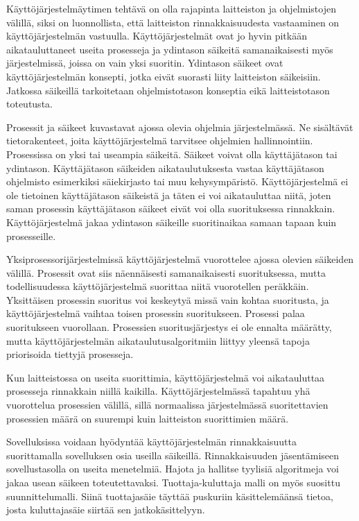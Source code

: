 \documentclass[a4paper, 12pt]{article}
\begin{document}
Käyttöjärjestelmäytimen tehtävä on olla rajapinta laitteiston ja ohjelmistojen 
välillä, siksi on luonnollista, että laitteiston rinnakkaisuudesta vastaaminen
on käyttöjärjestelmän vastuulla. Käyttöjärjestelmät ovat jo hyvin pitkään
aikatauluttaneet useita prosesseja ja ydintason säikeitä samanaikaisesti myös 
järjestelmissä, joissa on 
vain yksi suoritin.
Ydintason säikeet ovat käyttöjärjestelmän konsepti, jotka
eivät suorasti liity laitteiston säikeisiin. 
Jatkossa
säikeillä tarkoitetaan ohjelmistotason konseptia 
eikä laitteistotason toteutusta.


Prosessit ja säikeet kuvastavat ajossa olevia
ohjelmia järjestelmässä. Ne sisältävät tietorakenteet,
joita käyttöjärjestelmä tarvitsee ohjelmien hallinnointiin.
Prosessissa on yksi tai useampia säikeitä.
Säikeet voivat olla käyttäjätason tai ydintason. Käyttäjätason 
säikeiden aikataulutuksesta vastaa käyttäjätason ohjelmisto
esimerkiksi säiekirjasto tai muu kehysympäristö.
Käyttöjärjestelmä ei ole tietoinen käyttäjätason säikeistä
ja täten ei voi aikatauluttaa niitä, joten saman
prosessin käyttäjätason säikeet eivät voi olla
suorituksessa rinnakkain. 
Käyttöjärjestelmä jakaa ydintason säikeille suoritinaikaa samaan
tapaan kuin prosesseille.


Yksiprosessorijärjestelmissä käyttöjärjestelmä vuorottelee
ajossa olevien säikeiden välillä. Prosessit
ovat siis näennäisesti samanaikaisesti suorituksessa,
mutta todellisuudessa käyttöjärjestelmä suorittaa
niitä vuorotellen peräkkäin. Yksittäisen prosessin
suoritus voi keskeytyä missä vain kohtaa suoritusta, 
ja käyttöjärjestelmä vaihtaa toisen prosessin suoritukseen.
Prosessi palaa suoritukseen vuorollaan.
Prosessien suoritusjärjestys ei ole ennalta määrätty, mutta
käyttöjärjestelmän aikataulutusalgoritmiin liittyy yleensä
tapoja priorisoida tiettyjä prosesseja.


Kun laitteistossa on useita suorittimia, käyttöjärjestelmä
voi aikatauluttaa prosesseja rinnakkain niillä kaikilla.
Käyttöjärjestelmässä tapahtuu yhä
vuorottelua prosessien välillä, sillä normaalissa
järjestelmässä suoritettavien prosessien määrä on suurempi
kuin laitteiston suorittimien määrä.

Sovelluksissa voidaan hyödyntää käyttöjärjestelmän
rinnakkaisuutta suorittamalla sovelluksen osia useilla säikeillä.
Rinnakkaisuuden jäsentämiseen sovellustasolla on useita
menetelmiä. 
Hajota ja hallitse tyylisiä 
algoritmeja voi jakaa usean säikeen
toteutettavaksi.
Tuottaja-kuluttaja malli on myös
suosittu suunnittelumalli.
Siinä tuottajasäie täyttää
puskuriin käsittelemäänsä tietoa, josta kuluttajasäie siirtää
sen jatkokäsittelyyn.
\end{document}

